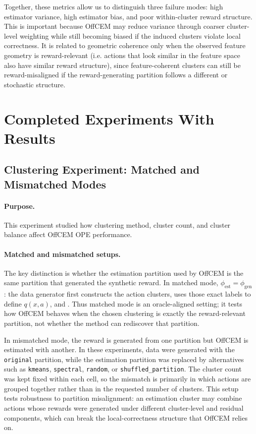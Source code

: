 \documentclass[11pt]{article}
\begin{document}
Together, these metrics allow us to distinguish three failure modes: high estimator variance, high estimator bias, and poor within-cluster reward structure. This is important because OffCEM may reduce variance through coarser cluster-level weighting while still becoming biased if the induced clusters violate local correctness. It is related to geometric coherence only when the observed feature geometry is reward-relevant (i.e. actions that look similar in the feature space also have similar reward structure), since feature-coherent clusters can still be reward-misaligned if the reward-generating partition follows a different or stochastic structure.


\section{Completed Experiments With Results}

\subsection{Clustering Experiment: Matched and Mismatched Modes}

\paragraph{Purpose.}
This experiment studied how clustering method, cluster count, and cluster balance affect OffCEM OPE performance.

\paragraph{Matched and mismatched setups.} The key distinction is whether the estimation partition used by OffCEM is the  same partition that generated the synthetic reward. In matched mode,  $\phi_{\mathrm{est}}=\phi_{\mathrm{gen}}$: the data generator first constructs  the action clusters, uses those exact labels to define $q(x,a)$, and . Thus matched mode is an oracle-aligned setting; it tests how OffCEM behaves when the chosen clustering is exactly the reward-relevant partition, not whether the method can rediscover that partition.

In mismatched mode, the reward is generated from one partition but OffCEM is estimated with another. In these experiments, data were generated with the  \texttt{original} partition, while the estimation partition was replaced by alternatives such as \texttt{kmeans}, \texttt{spectral}, \texttt{random}, or \texttt{shuffled\_partition}. The cluster count was kept fixed within each cell, so the mismatch is primarily in which actions are grouped together rather than in the requested number of clusters. This setup tests robustness to partition misalignment: an estimation cluster may combine actions whose rewards were generated under different cluster-level and residual components, which can break the local-correctness structure that OffCEM relies on.
\end{document}
